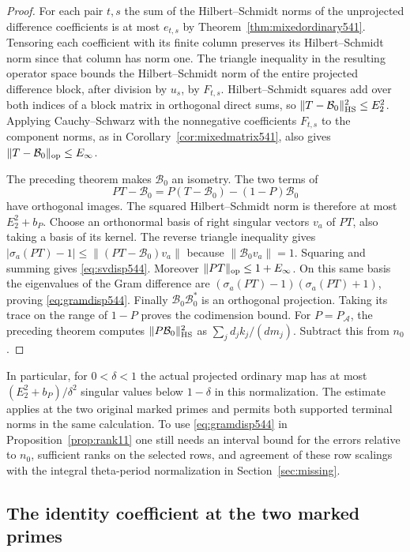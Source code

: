 \documentclass[a4paper,11pt]{article}
\theoremstyle{definition}
\theoremstyle{remark}
\numberwithin{equation}{section}
\begin{document}
\begin{proof}
For each pair \(t,s\) the sum of the Hilbert--Schmidt norms of
the unprojected difference coefficients is at most \(e_{t,s}\)
by Theorem~\ref{thm:mixedordinary541}. Tensoring each coefficient
with its finite column preserves its Hilbert--Schmidt norm
since that column has norm one. The triangle inequality in
the resulting operator space bounds the Hilbert--Schmidt norm
of the entire projected difference block, after division by
\(u_s\), by \(F_{t,s}\). Hilbert--Schmidt squares add over
both indices of a block matrix in orthogonal direct sums,
so \(\|T-\mathcal B_0\|_{\rm HS}^2\le E_2^2\). Applying
Cauchy--Schwarz with the nonnegative coefficients \(F_{t,s}\)
to the component norms, as in Corollary~\ref{cor:mixedmatrix541},
also gives \(\|T-\mathcal B_0\|_{\rm op}\le E_\infty\).

The preceding theorem makes \(\mathcal B_0\) an isometry.
The two terms of
\[
      PT-\mathcal B_0
         =P(T-\mathcal B_0)-(1-P)\mathcal B_0
\]
have orthogonal images. The squared Hilbert--Schmidt norm is
therefore at most \(E_2^2+b_P\). Choose an orthonormal basis
of right singular vectors \(v_a\) of \(PT\), also taking a
basis of its kernel. The reverse triangle inequality gives
\(
 |\sigma_a(PT)-1|\le\|(PT-\mathcal B_0)v_a\|
\)
because \(\|\mathcal B_0v_a\|=1\). Squaring and summing
gives \eqref{eq:svdisp544}. Moreover
\(\|PT\|_{\rm op}\le1+E_\infty\). On this same basis
the eigenvalues of the Gram difference are
\((\sigma_a(PT)-1)(\sigma_a(PT)+1)\), proving
\eqref{eq:gramdisp544}. Finally \(\mathcal B_0\mathcal B_0^*\)
is an orthogonal projection. Taking its trace on the range of
\(1-P\) proves the codimension bound. For \(P=P_{\mathcal A}\),
the preceding theorem computes \(\|P\mathcal B_0\|_{\rm HS}^2\)
as \(\sum_jd_j k_j/(dm_j)\). Subtract this from \(n_0\).
\end{proof}

In particular, for \(0<\delta<1\) the actual projected ordinary
map has at most \((E_2^2+b_P)/\delta^2\) singular values below
\(1-\delta\) in this normalization. The estimate applies at the
two original marked primes and permits both supported terminal
norms in the same calculation. To use \eqref{eq:gramdisp544}
in Proposition~\ref{prop:rank11} one still needs an interval
bound for the errors relative to \(n_0\), sufficient ranks
on the selected rows, and agreement of these row scalings with
the integral theta-period normalization in Section~\ref{sec:missing}.


\subsection{The identity coefficient at the two marked primes}
\label{sec:identitycoefficient551}
\end{document}
